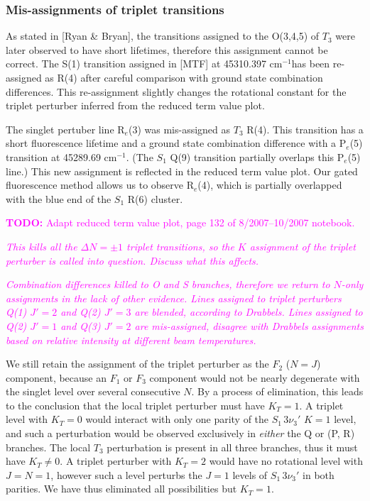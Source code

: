 \documentclass[12pt]{mitthesis}
\newcommand{\TODO} [1]{\textcolor{magenta}{\textbf{TODO:} #1}}
\newcommand{\POINT}[1]{\textcolor{magenta}{\emph{#1}}}
\newcommand{\rcm}{cm$^{-1}$}
\newcommand{\sing}{$S_1\,3\nu_3'$ }
\begin{document}
\subsubsection{Mis-assignments of triplet transitions}

As stated in [Ryan \& Bryan], the transitions assigned to the O(3,4,5)
of $T_3$ were later observed to have short lifetimes, therefore this
assignment cannot be correct.  The S(1) transition assigned in [MTF]
at 45310.397 \rcm has been re-assigned as R(4) after careful
comparison with ground state combination differences.  This
re-assignment slightly changes the rotational constant for the triplet
perturber inferred from the reduced term value plot.

The singlet pertuber line R$_e$(3) was mis-assigned as $T_3$ R(4).
This transition has a short fluorescence lifetime and a ground state
combination difference with a P$_e$(5) transition at 45289.69 \rcm.
(The $S_1$ Q(9) transition partially overlaps this P$_e$(5) line.)
This new assignment is reflected in the reduced term value plot.  Our
gated fluorescence method allows us to observe R$_e$(4), which is
partially overlapped with the blue end of the $S_1$ R(6) cluster.

\TODO{Adapt reduced term value plot, page 132 of 8/2007--10/2007
  notebook.}

\POINT{This kills all the $\Delta N=\pm 1$ triplet transitions, so the
  $K$ assignment of the triplet perturber is called into question.
  Discuss what this affects.}

\POINT{Combination differences killed to O and S branches, therefore
  we return to $N$-only assignments in the lack of other evidence.
  Lines assigned to triplet perturbers Q(1) $J'=2$ and Q(2) $J'=3$ are
  blended, according to Drabbels.  Lines assigned to Q(2) $J'=1$ and
  Q(3) $J'=2$ are mis-assigned, disagree with Drabbels assignments
  based on relative intensity at different beam temperatures.}

We still retain the assignment of the triplet perturber as the $F_2$
($N=J$) component, because an $F_1$ or $F_3$ component would not be
nearly degenerate with the singlet level over several consecutive $N$.
By a process of elimination, this leads to the conclusion that the
local triplet perturber must have $K_T=1$.  A triplet level with
$K_T=0$ would interact with only one parity of the \sing $K=1$ level,
and such a perturbation would be observed exclusively in \emph{either}
the Q or (P, R) branches.  The local $T_3$ perturbation is present in
all three branches, thus it must have $K_T\ne0$.  A triplet perturber
with $K_T=2$ would have no rotational level with $J=N=1$, however such
a level perturbs the $J=1$ levels of \sing in both parities.  We
have thus eliminated all possibilities but $K_T=1$.
\end{document}
